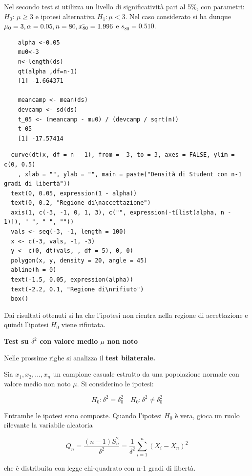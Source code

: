 Nel secondo test si utilizza un livello di significatività pari al 5\%, con parametri: $H_0$: $\mu \geq 3$ e ipotesi alternativa $H_1: \mu < 3$. Nel caso considerato si ha dunque $\mu_0 = 3, \alpha = 0.05, n = 80, \Bar{x_{80}} = 1.996$ e $s_{80} = 0.510$.


\vspace{5mm}
\begin{lstlisting}
    alpha <-0.05
    mu0<-3
    n<-length(ds)
    qt(alpha ,df=n-1)
    [1] -1.664371

    meancamp <- mean(ds)
    devcamp <- sd(ds)
    t_05 <- (meancamp - mu0) / (devcamp / sqrt(n))
    t_05
    [1] -17.57414
\end{lstlisting}

\vspace{5mm}
\begin{lstlisting}
  curve(dt(x, df = n - 1), from = -3, to = 3, axes = FALSE, ylim = c(0, 0.5)
    , xlab = "", ylab = "", main = paste("Densità di Student con n-1 gradi di libertà"))
  text(0, 0.05, expression(1 - alpha))
  text(0, 0.2, "Regione di\naccettazione")
  axis(1, c(-3, -1, 0, 1, 3), c("", expression(-t[list(alpha, n - 1)]), " ", " ", ""))
  vals <- seq(-3, -1, length = 100)
  x <- c(-3, vals, -1, -3)
  y <- c(0, dt(vals, , df = 5), 0, 0)
  polygon(x, y, density = 20, angle = 45)
  abline(h = 0)
  text(-1.5, 0.05, expression(alpha))
  text(-2.2, 0.1, "Regione di\nrifiuto")
  box()
\end{lstlisting}

Dai risultati ottenuti si ha che l'ipotesi non rientra nella regione di accettazione e quindi l'ipotesi $H_0$ viene rifiutata.

\vspace{5mm}
\noindent \textbf{Test su $\delta^2$ con valore medio $\mu$ non noto}

Nelle prossime righe si analizza il \textbf{test bilaterale.}

Sia $x_1, x_2, ..., x_n$ un campione casuale estratto da una popolazione normale con valore medio non noto $\mu$. Si considerino le ipotesi:

\[H_0:\delta^2 = \delta^2_0 \quad H_0:\delta^2 \neq \delta^2_0\]

Entrambe le ipotesi sono composte. Quando l'ipotesi $H_0$ è vera, gioca un ruolo rilevante la variabile aleatoria

\[Q_n = \frac{(n-1)S_n^2}{\delta^2} = \frac{1}{\delta^2} \sum_{i=1}^n(X_i - X_n)^2\]

che è distribuita con legge chi-quadrato con n-1 gradi di libertà.

